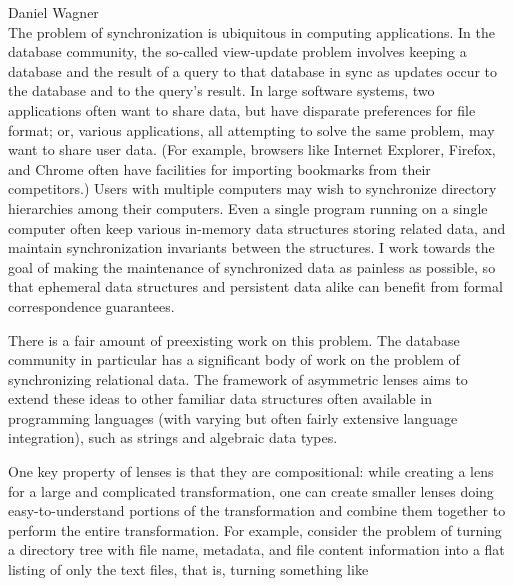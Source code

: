 \documentclass{article}
\begin{document}
{\noindent\large Daniel Wagner}\\[3ex]

The problem of synchronization is ubiquitous in computing applications. In
the database community, the so-called view-update problem involves keeping a
database and the result of a query to that database in sync as updates occur
to the database and to the query's result. In large software systems, two
applications often want to share data, but have disparate preferences for
file format; or, various applications, all attempting to solve the same
problem, may want to share user data. (For example, browsers like Internet
Explorer, Firefox, and Chrome often have facilities for importing bookmarks
from their competitors.) Users with multiple computers may wish to
synchronize directory hierarchies among their computers. Even a single
program running on a single computer often keep various in-memory data
structures storing related data, and maintain synchronization invariants
between the structures. I work towards the goal of making the maintenance of
synchronized data as painless as possible, so that ephemeral data structures
and persistent data alike can benefit from formal correspondence guarantees.

There is a fair amount of preexisting work on this problem. The database
community in particular has a significant body of work on the problem of
synchronizing relational data. The framework of asymmetric lenses aims to
extend these ideas to other familiar data structures often available in
programming languages (with varying but often fairly extensive language
integration), such as strings and algebraic data types.

One key property of lenses is that they are compositional: while creating a
lens for a large and complicated transformation, one can create smaller
lenses doing easy-to-understand portions of the transformation and combine
them together to perform the entire transformation. For example, consider
the problem of turning a directory tree with file name, metadata, and file
content information into a flat listing of only the text files, that is,
turning something like

\end{document}
